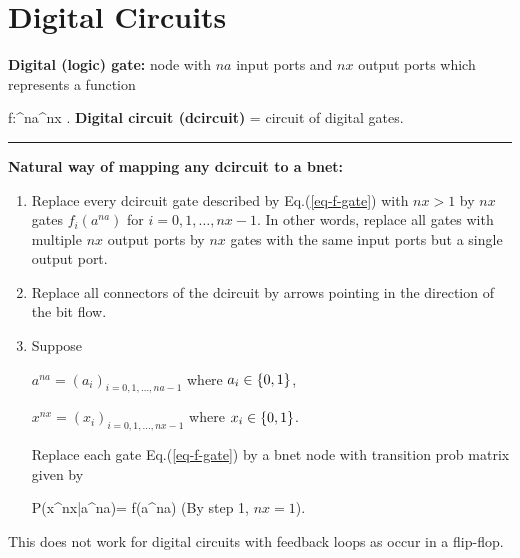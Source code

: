 \chapter{Digital Circuits}

{\bf Digital (logic) gate:} node with
$na$ input ports and $nx$ output ports
which represents a function

\beq
f:\bool^{na}\rarrow \bool^{nx}
\;.
\label{eq-f-gate}
\eeq
{\bf Digital circuit (dcircuit)} = circuit of digital gates.


\hrule\noindent
{\bf Natural way of mapping any
dcircuit to a bnet:}
\begin{enumerate}
\item
Replace every dcircuit  gate 
described by Eq.(\ref{eq-f-gate})
with
$nx>1$ by
$nx$ gates $f_i(a^{na})$
for $i=0, 1, \ldots, nx-1$.
In other words,
replace all gates
with
multiple $nx$ output ports
by $nx$ gates with the same input ports
but a single output port.
\item
Replace
all connectors of the dcircuit
by arrows 
pointing in the direction
of the bit flow.

\item
Suppose

$a^{na}=(a_i)_{i=0, 1,\dots, na-1}$ 
where $a_i\in \{0,1\}$,

$x^{nx}=(x_i)_{i=0, 1,\dots, nx-1}$ 
where $x_i\in \{0,1\}$. 

 Replace each gate Eq.(\ref{eq-f-gate})
 by a bnet 
node with transition
prob matrix given by


\beq\color{blue}
P(x^{nx}|a^{na})=
f(a^{na})
\eeq
(By step 1, $nx=1$).

\end{enumerate}

This does not work
for digital circuits 
with feedback loops 
as occur in a flip-flop.